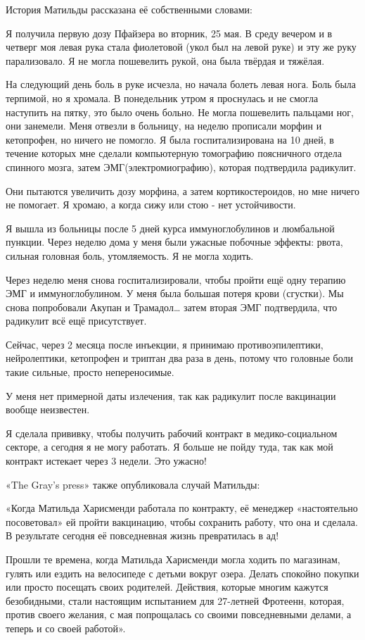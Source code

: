 
История Матильды рассказана её собственными словами:

Я получила первую дозу Пфайзера во вторник, 25 мая. В среду вечером и в четверг
моя левая рука стала фиолетовой (укол был на левой руке) и эту же руку
парализовало. Я не могла пошевелить рукой, она была твёрдая и тяжёлая.

На следующий день боль в руке исчезла, но начала болеть левая нога. Боль была
терпимой, но я хромала. В понедельник утром я проснулась и не смогла наступить
на пятку, это было очень больно. Не могла пошевелить пальцами ног, они
занемели. Меня отвезли в больницу, на неделю прописали морфин и кетопрофен, но
ничего не помогло. Я была госпитализирована на 10 дней, в течение которых мне
сделали компьютерную томографию поясничного отдела спинного мозга, затем
ЭМГ(электромиографию), которая подтвердила радикулит.

Они пытаются увеличить дозу морфина, а затем кортикостероидов, но мне ничего не
помогает. Я хромаю, а когда сижу или стою - нет устойчивости.

Я вышла из больницы после 5 дней курса иммуноглобулинов и люмбальной
пункции. Через неделю дома у меня были ужасные побочные эффекты: рвота, сильная
головная боль, утомляемость. Я не могла ходить.

Через неделю меня снова госпитализировали, чтобы пройти ещё одну терапию ЭМГ и
иммуноглобулином. У меня была большая потеря крови (сгустки). Мы снова
попробовали Акупан и Трамадол… затем вторая ЭМГ подтвердила, что радикулит всё
ещё присутствует.

Сейчас, через 2 месяца после инъекции, я принимаю противоэпилептики,
нейролептики, кетопрофен и триптан два раза в день, потому что головные боли
такие сильные, просто непереносимые.

У меня нет примерной даты излечения, так как радикулит после вакцинации вообще
неизвестен.

Я сделала прививку, чтобы получить рабочий контракт в медико-социальном секторе,
а сегодня я не могу работать. Я больше не пойду туда, так как мой контракт
истекает через 3 недели. Это ужасно!

«The Gray's press» также опубликовала случай Матильды:

«Когда Матильда Харисменди работала по контракту, её менеджер «настоятельно
посоветовал» ей пройти вакцинацию, чтобы сохранить работу, что она и сделала. В
результате сегодня её повседневная жизнь превратилась в ад!

Прошли те времена, когда Матильда Харисменди могла ходить по магазинам, гулять
или ездить на велосипеде с детьми вокруг озера. Делать спокойно покупки или
просто посещать своих родителей. Действия, которые многим кажутся безобидными,
стали настоящим испытанием для 27-летней Фротеенн, которая, против своего
желания, с мая попрощалась со своими повседневными делами, а теперь и со своей
работой».
